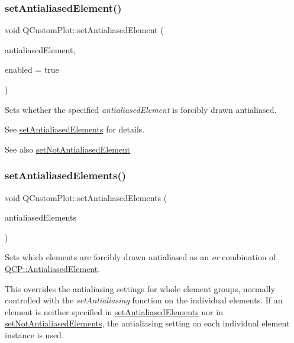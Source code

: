 \subsubsection{\texorpdfstring{set\+Antialiased\+Element()}{setAntialiasedElement()}}
{\footnotesize\ttfamily void Q\+Custom\+Plot\+::set\+Antialiased\+Element (\begin{DoxyParamCaption}\item[{\hyperlink{namespace_q_c_p_ae55dbe315d41fe80f29ba88100843a0c}{Q\+C\+P\+::\+Antialiased\+Element}}]{antialiased\+Element,  }\item[{bool}]{enabled = {\ttfamily true} }\end{DoxyParamCaption})}

Sets whether the specified {\itshape antialiased\+Element} is forcibly drawn antialiased.

See \hyperlink{class_q_custom_plot_af6f91e5eab1be85f67c556e98c3745e8}{set\+Antialiased\+Elements} for details.

\begin{DoxySeeAlso}{See also}
\hyperlink{class_q_custom_plot_afc657938a707c890e449ae89203a076d}{set\+Not\+Antialiased\+Element} 
\end{DoxySeeAlso}
\hypertarget{class_q_custom_plot_af6f91e5eab1be85f67c556e98c3745e8}{}\label{class_q_custom_plot_af6f91e5eab1be85f67c556e98c3745e8} 
\subsubsection{\texorpdfstring{set\+Antialiased\+Elements()}{setAntialiasedElements()}}
{\footnotesize\ttfamily void Q\+Custom\+Plot\+::set\+Antialiased\+Elements (\begin{DoxyParamCaption}\item[{const Q\+C\+P\+::\+Antialiased\+Elements \&}]{antialiased\+Elements }\end{DoxyParamCaption})}

Sets which elements are forcibly drawn antialiased as an {\itshape or} combination of \hyperlink{namespace_q_c_p_ae55dbe315d41fe80f29ba88100843a0c}{Q\+C\+P\+::\+Antialiased\+Element}.

This overrides the antialiasing settings for whole element groups, normally controlled with the {\itshape set\+Antialiasing} function on the individual elements. If an element is neither specified in \hyperlink{class_q_custom_plot_af6f91e5eab1be85f67c556e98c3745e8}{set\+Antialiased\+Elements} nor in \hyperlink{class_q_custom_plot_ae10d685b5eabea2999fb8775ca173c24}{set\+Not\+Antialiased\+Elements}, the antialiasing setting on each individual element instance is used.

